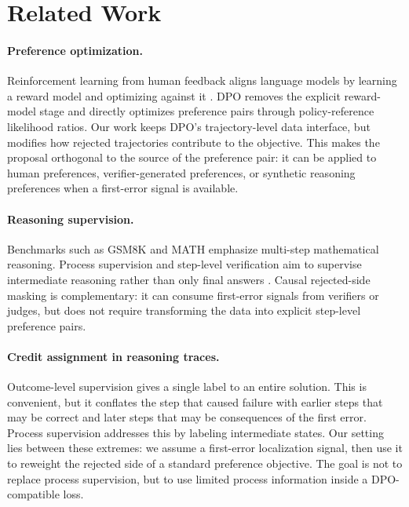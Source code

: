 \section{Related Work}

\paragraph{Preference optimization.}
Reinforcement learning from human feedback aligns language models by learning a reward model and optimizing against it \citep{ouyang2022training}. DPO \citep{rafailov2023direct} removes the explicit reward-model stage and directly optimizes preference pairs through policy-reference likelihood ratios. Our work keeps DPO's trajectory-level data interface, but modifies how rejected trajectories contribute to the objective. This makes the proposal orthogonal to the source of the preference pair: it can be applied to human preferences, verifier-generated preferences, or synthetic reasoning preferences when a first-error signal is available.

\paragraph{Reasoning supervision.}
Benchmarks such as GSM8K \citep{cobbe2021training} and MATH \citep{hendrycks2021measuring} emphasize multi-step mathematical reasoning. Process supervision and step-level verification aim to supervise intermediate reasoning rather than only final answers \citep{lightman2023lets}. Causal rejected-side masking is complementary: it can consume first-error signals from verifiers or judges, but does not require transforming the data into explicit step-level preference pairs.

\paragraph{Credit assignment in reasoning traces.}
Outcome-level supervision gives a single label to an entire solution. This is convenient, but it conflates the step that caused failure with earlier steps that may be correct and later steps that may be consequences of the first error. Process supervision addresses this by labeling intermediate states. Our setting lies between these extremes: we assume a first-error localization signal, then use it to reweight the rejected side of a standard preference objective. The goal is not to replace process supervision, but to use limited process information inside a DPO-compatible loss.

